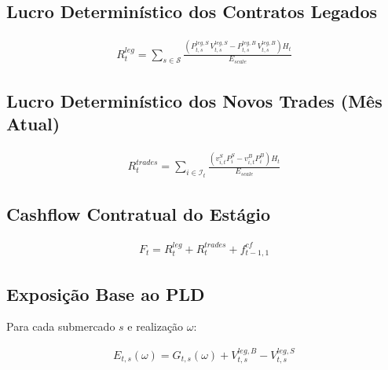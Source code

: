 \documentclass{article}
\begin{document}
\subsection{Lucro Determinístico dos Contratos Legados}

\begin{align}
    R^{leg}_t =
    \sum_{s \in \mathcal{S}}
    \frac{\left( P^{leg,S}_{t,s}\, V^{leg,S}_{t,s} - P^{leg,B}_{t,s}\, V^{leg,B}_{t,s} \right) H_t}
         {E_{scale}}
\end{align}

\subsection{Lucro Determinístico dos Novos Trades (Mês Atual)}

\begin{align}
    R^{trades}_t =
    \sum_{i \in \mathcal{I}_{t}}
    \frac{\left( v^{S}_{i,t} P^{S}_{i} - v^{B}_{i,t} P^{B}_{i} \right) H_t}{E_{scale}}
\end{align}

\subsection{Cashflow Contratual do Estágio}

\begin{align}
    F_t = R^{leg}_t + R^{trades}_t + f^{cf}_{t-1,1}
\end{align}

\subsection{Exposição Base ao PLD}

Para cada submercado $s$ e realização $\omega$:

\begin{align}
    E_{t,s}(\omega) = G_{t,s}(\omega) + V^{leg,B}_{t,s} - V^{leg,S}_{t,s}
\end{align}

\end{document}
